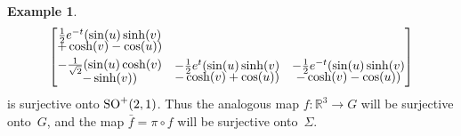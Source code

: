 \documentclass[10pt,a4paper]{amsart}
\numberwithin{equation}{section}
\theoremstyle{definition}
\newtheorem{exmpl}[teo]{Example}
\begin{document}
\begin{exmpl}
\begin{gather*}
\begin{bmatrix}
\begin{array}{@{}c@{}}\frac{1}{2}e^{-t}(\sin(u) \sinh(v)\vspace{-1mm}\\ +\cosh(v)-\cos(u))\end{array}
\vspace{1mm}\\
\begin{array}{@{}c@{}}-\frac{1}{\sqrt{2}}(\sin(u)\cosh(v)\vspace{-1mm}\\ -\sinh(v))\end{array} &
\begin{array}{@{}c@{}}-\frac{1}{2}e^t(\sin(u)\sinh(v)\vspace{-1mm}\\ -\cosh(v)+\cos(u))\end{array} &
\begin{array}{@{}c@{}}-\frac{1}{2}e^{-t}(\sin(u)\sinh(v)\vspace{-1mm}\\ -\cosh(v)-\cos(u))\end{array}
\end{bmatrix}
\end{gather*}
is surjective onto ${\rm SO}^+(2,1)$.
Thus the analogous map $f:\mathbb{R}^3 \to G$ will be surjective onto~$G$, and the map $\bar{f} = \pi \circ f$ will be
surjective onto~$\Sigma$.


\end{exmpl}
\end{document}
